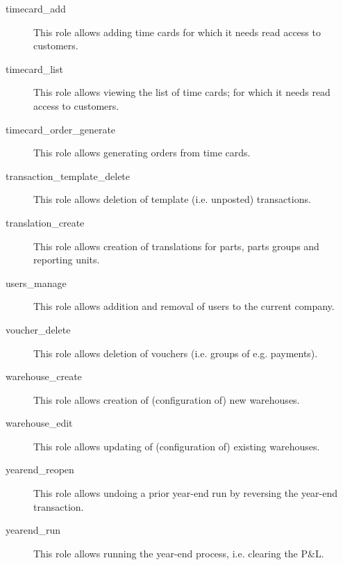 \begin{description}
\item [timecard\_add] \htmlspacing 
                         This role allows adding time cards for which it needs
                         read access to customers.
\item [timecard\_list] \htmlspacing 
                         This role allows viewing the list of time cards;
                         for which it needs read access to customers.
\item [timecard\_order\_generate] \htmlspacing 
                         This role allows generating orders from time cards.
\item [transaction\_template\_delete] \htmlspacing 
                         This role allows deletion of template (i.e. unposted)
                         transactions.
\item [translation\_create] \htmlspacing 
                         This role allows creation of translations for parts,
                         parts groups and reporting units.
\item [users\_manage] \htmlspacing 
                         This role allows addition and removal of users to
                         the current company.
\item [voucher\_delete] \htmlspacing 
                         This role allows deletion of vouchers (i.e. groups of e.g. payments).
\item [warehouse\_create] \htmlspacing 
                         This role allows creation of (configuration of) new warehouses.
\item [warehouse\_edit] \htmlspacing 
                         This role allows updating of (configuration of) existing warehouses.
\item [yearend\_reopen] \htmlspacing 
                         This role allows undoing a prior year-end run by reversing the year-end transaction.
\item [yearend\_run] \htmlspacing 
                         This role allows running the year-end process, i.e. clearing the P\&L.
\end{description}